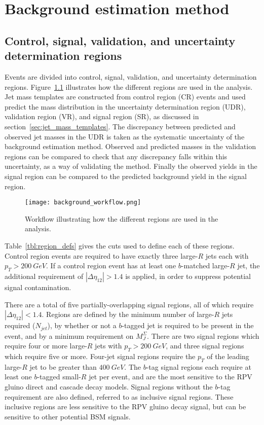 \chapter{Background estimation method}\label{ch:background_method}

\section{Control, signal, validation, and uncertainty determination regions} \label{sec:region_defs}
Events are divided into control, signal, validation, and uncertainty determination regions.
Figure~\ref{fig:workflow} illustrates how the different regions are used in the analysis.
Jet mass templates are constructed from control region (CR) events and used predict the mass distribution in the uncertainty determination region (UDR), validation region (VR), and signal region (SR), as discussed in section~\ref{sec:jet_mass_templates}.
The discrepancy between predicted and observed jet masses in the UDR is taken as the systematic uncertainty of the background estimation method.
Observed and predicted masses in the validation regions can be compared to check that any discrepancy falls within this uncertainty, as a way of validating the method.
Finally the observed yields in the signal region can be compared to the predicted background yield in the signal region.

\begin{figure}[!ht]
    \centering
    \texttt{[image: background\_workflow.png]}
    \caption{Workflow illustrating how the different regions are used in the analysis.}
    \label{fig:workflow}
\end{figure}

Table~\ref{tbl:region_defs} gives the cuts used to define each of these regions.
Control region events are required to have exactly three large-$R$ jets each with $p_{T}>200~GeV$.
If a control region event has at least one $b$-matched large-$R$ jet, the additional requirement of $|\Delta\eta_{12}|>1.4$ is applied, in order to suppress potential signal contamination.

There are a total of five partially-overlapping signal regions, all of which require $|\Delta\eta_{12}|<1.4$.
Regions are defined by the minimum number of large-$R$ jets required ($N_{jet}$), by whether or not a $b$-tagged jet is required to be present in the event, and by a minimum requirement on $M_{J}^{\Sigma}$.
There are two signal regions which require four or more large-$R$ jets with $p_{T}>200~GeV$, and three signal regions which require five or more.
Four-jet signal regions require the $p_T$ of the leading large-$R$ jet to be greater than $400~GeV$.
The $b$-tag signal regions each require at least one $b$-tagged small-$R$ jet per event, and are the most sensitive to the RPV gluino direct and cascade decay models.
Signal regions without the $b$-tag requirement are also defined, referred to as inclusive signal regions.
These inclusive regions are less sensitive to the RPV gluino decay signal, but can be sensitive to other potential BSM signals.

